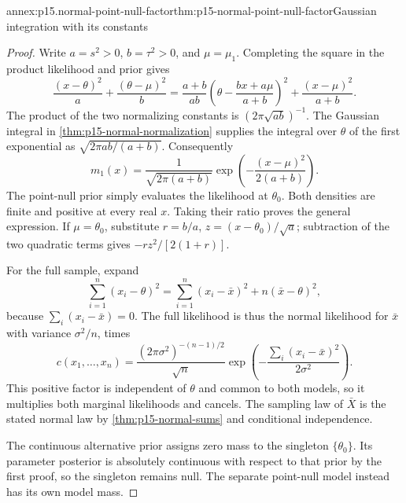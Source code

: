 \begin{annexitem}{annex:p15.normal-point-null-factor}{thm:p15-normal-point-null-factor}{Gaussian integration with its constants}
\begin{proof}
Write \(a=s^2>0\), \(b=\tau^2>0\), and \(\mu=\mu_1\).
Completing the square in the product likelihood and prior gives
\[
 \frac{(x-\theta)^2}{a}+\frac{(\theta-\mu)^2}{b}
 =\frac{a+b}{ab}
     \left(\theta-\frac{bx+a\mu}{a+b}\right)^2
   +\frac{(x-\mu)^2}{a+b}.
\]
The product of the two normalizing constants is
\((2\pi\sqrt{ab})^{-1}\). The Gaussian integral in
\cref{thm:p15-normal-normalization} supplies the integral over \(\theta\)
of the first exponential as \(\sqrt{2\pi ab/(a+b)}\).
Consequently
\[
 m_1(x)=\frac1{\sqrt{2\pi(a+b)}}
           \exp\!\left(-\frac{(x-\mu)^2}{2(a+b)}\right).
\]
The point-null prior simply evaluates the likelihood at \(\theta_0\).
Both densities are finite and positive at every real \(x\).
Taking their ratio proves the general expression. If \(\mu=\theta_0\),
substitute \(r=b/a\), \(z=(x-\theta_0)/\sqrt a\); subtraction of the
two quadratic terms gives \(-rz^2/[2(1+r)]\).

For the full sample, expand
\[
 \sum_{i=1}^n(x_i-\theta)^2
 =\sum_{i=1}^n(x_i-\bar x)^2+n(\bar x-\theta)^2,
\]
because \(\sum_i(x_i-\bar x)=0\). The full likelihood is thus the
normal likelihood for \(\bar x\) with variance \(\sigma^2/n\), times
\[
 c(x_1,\ldots,x_n)
 =\frac{(2\pi\sigma^2)^{-(n-1)/2}}{\sqrt n}
    \exp\!\left(-\frac{\sum_i(x_i-\bar x)^2}{2\sigma^2}\right).
\]
This positive factor is independent of \(\theta\) and common to both
models, so it multiplies both marginal likelihoods and cancels.
The sampling law of \(\bar X\) is the stated normal law by
\cref{thm:p15-normal-sums} and conditional independence.

The continuous alternative prior assigns zero mass to the singleton
\(\{\theta_0\}\). Its parameter posterior is absolutely continuous
with respect to that prior by the first proof, so the singleton remains
null. The separate point-null model instead has its own model mass.
\end{proof}
\end{annexitem}


